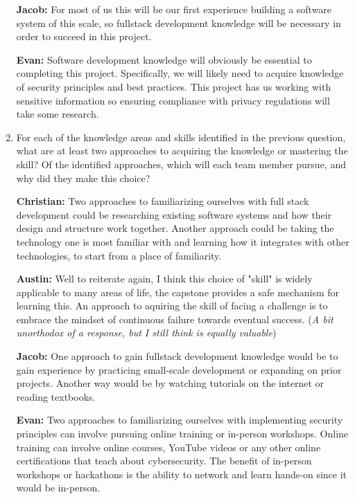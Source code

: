 \documentclass[12pt]{article}
\begin{document}
\begin{enumerate}
  \textbf{Jacob: } For most of us this will be our first experience building a software system of this scale, so fullstack development knowledge will be necessary in order to succeed in this project.

  \textbf{Evan: } Software development knowledge will obviously be essential to completing this project. Specifically, we will likely need to acquire knowledge of security principles and best practices. This project has us working with sensitive information so ensuring compliance with privacy regulations will take some research.

  \item For each of the knowledge areas and skills identified in the previous
  question, what are at least two approaches to acquiring the knowledge or
  mastering the skill?  Of the identified approaches, which will each team
  member pursue, and why did they make this choice?

  \textbf{Christian:} Two approaches to familiarizing ourselves with full stack development could be researching existing software systems and how their design and structure work together. Another approach could be taking the technology one is most familiar with and learning how it integrates with other technologies, to start from a place of familiarity.

  \textbf{Austin: } Well to reiterate again, I think this choice of "skill" is widely applicable to many areas of life, the capstone provides a safe mechanism for learning this. An approach to aquiring the skill of facing a challenge is to embrace the mindset of continuous failure towards eventual success. (\textit{A bit unorthodox of a response, but I still think is equally valuable})
  
  \textbf{Jacob: } One approach to gain fullstack development knowledge would be to gain experience by practicing small-scale development or expanding on prior projects. Another way would be by watching tutorials on the internet or reading textbooks.
  
  \textbf{Evan: } Two approaches to familiarizing ourselves with implementing security principles can involve pursuing online training or in-person workshops. Online training can involve online courses, YouTube videos or any other online certifications that teach about cybersecurity. The benefit of in-person workshops or hackathons is the ability to network and learn hands-on since it would be in-person.

\end{enumerate}
\end{document}
